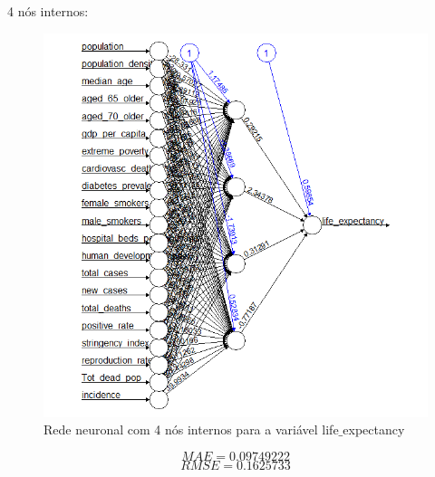 \documentclass[conference]{IEEEtran}
\begin{document}
4 nós internos:
\begin{figure}[htbp]
\centerline{\includegraphics[width=0.95\columnwidth]{images/04_4.png}}
\caption{Rede neuronal com 4 nós internos para a variável life$\_$expectancy}
\label{4c2}
\end{figure}
\begin{equation}
MAE=0.09749222\label{4c2_mae}
\end{equation}
\begin{equation}
RMSE=0.1625733\label{4c2_rmse}
\end{equation}
\end{document}
